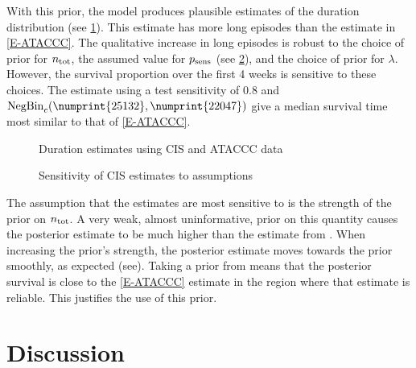 \documentclass[thesis.tex]{subfiles}
\begin{document}
With this prior, the model produces plausible estimates of the duration distribution (see \cref{imperf-test:fig:cis-estimates}).
This estimate has more long episodes than the estimate in \cref{E-ATACCC}.
The qualitative increase in long episodes is robust to the choice of prior for $n_\text{tot}$, the assumed value for $p_\text{sens}$ (see \cref{imperf-test:fig:cis-sensitivity}), and the choice of prior for $\lambda$.
However, the survival proportion over the first 4 weeks is sensitive to these choices.
The estimate using a test sensitivity of 0.8 and $\NBc(\numprint{25132}, \numprint{22047})$ give a median survival time most similar to that of \cref{E-ATACCC}.
\begin{figure}
  \caption{Duration estimates using CIS and ATACCC data}
  \label{imperf-test:fig:cis-estimates}
\end{figure}
\begin{figure}
  \caption{Sensitivity of CIS estimates to assumptions}
  \label{imperf-test:fig:cis-sensitivity}
\end{figure}

The assumption that the estimates are most sensitive to is the strength of the prior on $n_\text{tot}$.
A very weak, almost uninformative, prior on this quantity causes the posterior estimate to be much higher than the estimate from \textcite{birrellRTM2}.
When increasing the prior's strength, the posterior estimate moves towards the prior smoothly, as expected (see).
Taking a prior from \textcite{birrellRTM2} means that the posterior survival is close to the \cref{E-ATACCC} estimate in the region where that estimate is reliable.
This justifies the use of this prior.

\section{Discussion} \label{imperf-test:sec:discussion}

\end{document}

